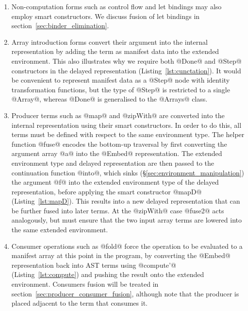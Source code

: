 \begin{enumerate}
\item Non-computation forms such as control flow and let bindings may also
    employ smart constructors. We discuss fusion of let bindings in
    section~\ref{sec:binder_elimination}.

\item Array introduction forms convert their argument into the internal
    representation by adding the term as manifest data into the extended
    environment. This also illustrates why we require both @Done@ and @Step@
    constructors in the delayed representation (Listing~\ref{lst:cunctation}).
    It would be convenient to represent manifest data as a @Step@ node with
    identity transformation functions, but the type of @Step@ is restricted to a
    single @Array@, whereas @Done@ is generalised to the @Arrays@ class.

\item Producer terms such as @map@ and @zipWith@ are converted into the internal
    representation using their smart constructors. In order to do this, all
    terms must be defined with respect to the same environment type. The helper
    function @fuse@ encodes the bottom-up traversal by first converting the
    argument array @a@ into the @Embed@ representation. The extended environment
    type and delayed representation are then passed to the continuation function
    @into@, which sinks (\S\ref{sec:environment_manipulation}) the argument @f@
    into the extended environment type of the delayed representation, before
    applying the smart constructor @mapD@ (Listing~\ref{lst:mapD}). This results
    into a new delayed representation that can be further fused into later
    terms. At the @zipWith@ case @fuse2@ acts analogously, but must ensure that
    the two input array terms are lowered into the same extended environment.

\item Consumer operations such as @fold@ force the operation to be evaluated to
    a manifest array at this point in the program, by converting the @Embed@
    representation back into AST terms using @compute'@
    (Listing~\ref{lst:compute}) and pushing the result onto the extended
    environment. Consumers fusion will be treated in
    section~\ref{sec:producer_consumer_fusion}, although note that the producer
    is placed adjacent to the term that consumes it.

\end{enumerate}

